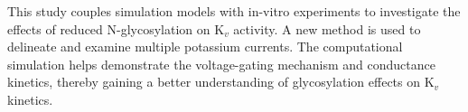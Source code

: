 \documentclass[10pt,letterpaper]{article}
\begin{document}
This study couples simulation models with in-vitro experiments to investigate the effects of reduced N-glycosylation on $\text{K}_{v}$ activity. A new method is used to delineate and examine multiple potassium currents. The computational simulation helps demonstrate the voltage-gating mechanism and conductance kinetics, thereby gaining a better understanding of glycosylation effects on $\text{K}_{v}$ kinetics.

% 
% 
% 
% 
% 
% 
\end{document}
